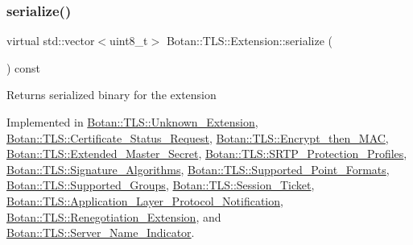 \subsubsection{\texorpdfstring{serialize()}{serialize()}}
{\footnotesize\ttfamily virtual std\+::vector$<$uint8\+\_\+t$>$ Botan\+::\+T\+L\+S\+::\+Extension\+::serialize (\begin{DoxyParamCaption}{ }\end{DoxyParamCaption}) const\hspace{0.3cm}{\ttfamily [pure virtual]}}

\begin{DoxyReturn}{Returns}
serialized binary for the extension 
\end{DoxyReturn}


Implemented in \mbox{\hyperlink{class_botan_1_1_t_l_s_1_1_unknown___extension_aa0edf5df42996a8634ac7a0d35114e2f}{Botan\+::\+T\+L\+S\+::\+Unknown\+\_\+\+Extension}}, \mbox{\hyperlink{class_botan_1_1_t_l_s_1_1_certificate___status___request_a9f468e7f03c565cd88f327924fa9ef7c}{Botan\+::\+T\+L\+S\+::\+Certificate\+\_\+\+Status\+\_\+\+Request}}, \mbox{\hyperlink{class_botan_1_1_t_l_s_1_1_encrypt__then___m_a_c_a599289acb3fc84c9e34a1dee1345904e}{Botan\+::\+T\+L\+S\+::\+Encrypt\+\_\+then\+\_\+\+M\+AC}}, \mbox{\hyperlink{class_botan_1_1_t_l_s_1_1_extended___master___secret_a4665dff15e868d0f9f45d934767d9507}{Botan\+::\+T\+L\+S\+::\+Extended\+\_\+\+Master\+\_\+\+Secret}}, \mbox{\hyperlink{class_botan_1_1_t_l_s_1_1_s_r_t_p___protection___profiles_afee35a4c6428af5684932384dc8bb3c3}{Botan\+::\+T\+L\+S\+::\+S\+R\+T\+P\+\_\+\+Protection\+\_\+\+Profiles}}, \mbox{\hyperlink{class_botan_1_1_t_l_s_1_1_signature___algorithms_ac94e8e1fd0adbeeb18e318ea5ce83c40}{Botan\+::\+T\+L\+S\+::\+Signature\+\_\+\+Algorithms}}, \mbox{\hyperlink{class_botan_1_1_t_l_s_1_1_supported___point___formats_aacbe9742935210838f2e17e0dcecc494}{Botan\+::\+T\+L\+S\+::\+Supported\+\_\+\+Point\+\_\+\+Formats}}, \mbox{\hyperlink{class_botan_1_1_t_l_s_1_1_supported___groups_a013f5094de8ead5c72eb9f9f4adb9481}{Botan\+::\+T\+L\+S\+::\+Supported\+\_\+\+Groups}}, \mbox{\hyperlink{class_botan_1_1_t_l_s_1_1_session___ticket_a446a320f05bfc710740defcd5ac0ca58}{Botan\+::\+T\+L\+S\+::\+Session\+\_\+\+Ticket}}, \mbox{\hyperlink{class_botan_1_1_t_l_s_1_1_application___layer___protocol___notification_af665dac05218679d77fbd990e877d3d1}{Botan\+::\+T\+L\+S\+::\+Application\+\_\+\+Layer\+\_\+\+Protocol\+\_\+\+Notification}}, \mbox{\hyperlink{class_botan_1_1_t_l_s_1_1_renegotiation___extension_ae3c9adc3793b96cd2e1c0801fe0068da}{Botan\+::\+T\+L\+S\+::\+Renegotiation\+\_\+\+Extension}}, and \mbox{\hyperlink{class_botan_1_1_t_l_s_1_1_server___name___indicator_a0088bcdbfb50c9b2bf13ec3fe1144439}{Botan\+::\+T\+L\+S\+::\+Server\+\_\+\+Name\+\_\+\+Indicator}}.

